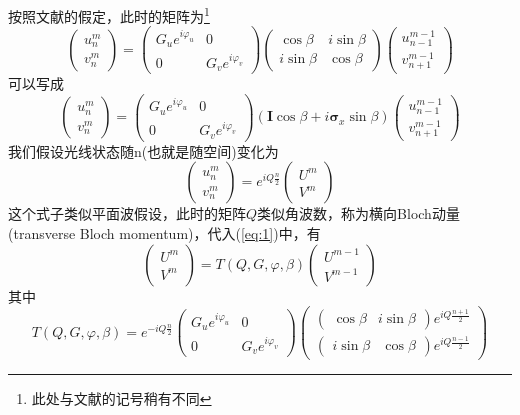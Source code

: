 \documentclass[hyperref,UTF8]{ctexart}
\begin{document}
按照文献的假定，此时的矩阵为\footnote{此处与文献的记号稍有不同}
\[\begin{pmatrix}
    u_n^m\\v_n^m
\end{pmatrix}=\begin{pmatrix}
    G_u e^{i\varphi_u}&0\\
    0&G_ve^{i\varphi_v}
\end{pmatrix} \begin{pmatrix}
     \cos \beta& i \sin \beta\\
     i \sin \beta& \cos \beta
\end{pmatrix}\begin{pmatrix}
    u_{n-1}^{m-1}\\v_{n+1}^{m-1}
\end{pmatrix}\]
可以写成
\begin{equation}\begin{pmatrix}
    u_n^m\\v_n^m
\end{pmatrix}=\begin{pmatrix}
    G_u e^{i\varphi_u}&0\\
    0&G_ve^{i\varphi_v}
\end{pmatrix} (\mathbf{I} \cos\beta +i\mathbf{\sigma}_x \sin\beta)\begin{pmatrix}
    u_{n-1}^{m-1}\\v_{n+1}^{m-1}
\end{pmatrix} \label{eq:1}
\end{equation}
我们假设光线状态随n(也就是随空间)变化为
\[\begin{pmatrix}
    u_n^m\\v_n^m
\end{pmatrix}=e^{iQ\frac{n}{2}}\begin{pmatrix}
    U^{m}\\V^{m}
\end{pmatrix}\]
这个式子类似平面波假设，此时的矩阵$Q$类似角波数，称为横向Bloch动量(transverse Bloch momentum)，代入(\ref{eq:1})中，有
\[\begin{pmatrix}
    U^m\\V^m
\end{pmatrix}=T(Q,G,\varphi,\beta)\begin{pmatrix}
    U^{m-1}\\V^{m-1}
\end{pmatrix}\]
其中
\begin{equation}T(Q,G,\varphi,\beta)=e^{-iQ\frac{n}{2}}\begin{pmatrix}
    G_u e^{i\varphi_u}&0\\
    0&G_ve^{i\varphi_v}
\end{pmatrix} \begin{pmatrix}
    \begin{pmatrix}
        \cos \beta& i \sin \beta
    \end{pmatrix}e^{iQ\frac{n+1}{2}}\\
    \begin{pmatrix}
        i \sin \beta& \cos \beta
    \end{pmatrix}e^{iQ\frac{n-1}{2}}
\end{pmatrix}\label{eq:T}\end{equation}
\end{document}
